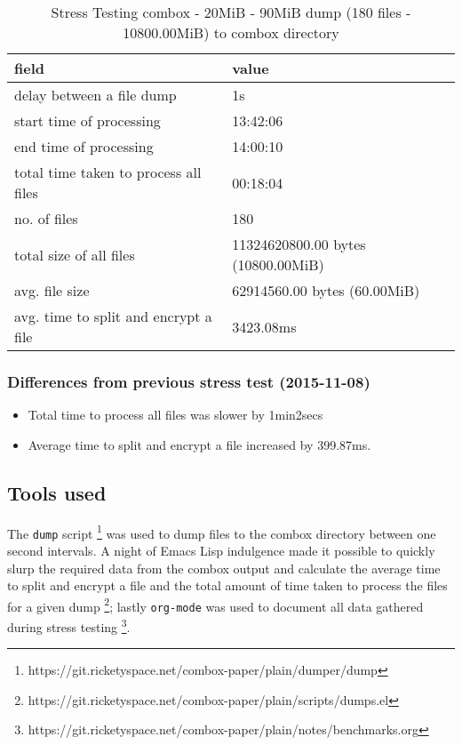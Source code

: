 \begin{center}
  \begin{table}[h]
    \begin{tabular}{ll}
      field & value\\
      \hline
      delay between a file dump & 1s\\
      start time of processing & 13:42:06\\
      end time of processing & 14:00:10\\
      total time taken to process all files & 00:18:04\\
      no. of files & 180\\
      total size of all files & 11324620800.00 bytes (10800.00MiB)\\
      avg. file size & 62914560.00 bytes (60.00MiB)\\
      avg. time to split and encrypt a file & 3423.08ms\\
    \end{tabular}
    \caption{Stress Testing combox - 20MiB - 90MiB dump (180 files - 10800.00MiB) to combox directory}
  \end{table}
\end{center}

\subsubsection{Differences from previous stress test (2015-11-08)}

\begin{itemize}
\item Total time to process all files was slower by 1min2secs
\item Average time to split and encrypt a file increased by 399.87ms.
\end{itemize}

\subsection{Tools used}\label{4-st-tu}

The \verb+dump+ script
\footnote{https://git.ricketyspace.net/combox-paper/plain/dumper/dump}
was used to dump files to the combox directory between one second
intervals. A night of Emacs Lisp indulgence made it possible to
quickly slurp the required data from the combox output and calculate
the average time to split and encrypt a file and the total amount of
time taken to process the files for a given dump
\footnote{https://git.ricketyspace.net/combox-paper/plain/scripts/dumps.el};
lastly \verb+org-mode+ was used to document all data gathered during
stress testing
\footnote{https://git.ricketyspace.net/combox-paper/plain/notes/benchmarks.org}.

